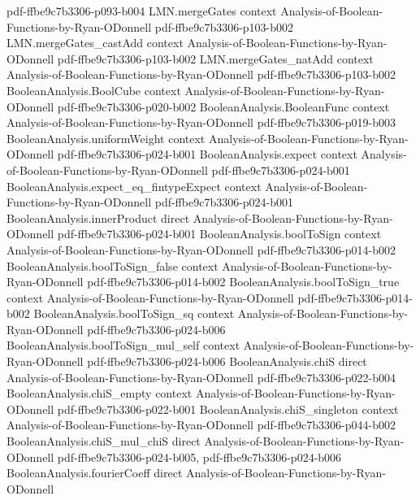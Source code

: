 \begin{lemma}
  {pdf-ffbe9c7b3306-p093-b004}
\proofstep
  {LMN.mergeGates}
  {context}
  {Analysis-of-Boolean-Functions-by-Ryan-ODonnell}
  {pdf-ffbe9c7b3306-p103-b002}
\proofstep
  {LMN.mergeGates_castAdd}
  {context}
  {Analysis-of-Boolean-Functions-by-Ryan-ODonnell}
  {pdf-ffbe9c7b3306-p103-b002}
\proofstep
  {LMN.mergeGates_natAdd}
  {context}
  {Analysis-of-Boolean-Functions-by-Ryan-ODonnell}
  {pdf-ffbe9c7b3306-p103-b002}
\proofstep
  {BooleanAnalysis.BoolCube}
  {context}
  {Analysis-of-Boolean-Functions-by-Ryan-ODonnell}
  {pdf-ffbe9c7b3306-p020-b002}
\proofstep
  {BooleanAnalysis.BooleanFunc}
  {context}
  {Analysis-of-Boolean-Functions-by-Ryan-ODonnell}
  {pdf-ffbe9c7b3306-p019-b003}
\proofstep
  {BooleanAnalysis.uniformWeight}
  {context}
  {Analysis-of-Boolean-Functions-by-Ryan-ODonnell}
  {pdf-ffbe9c7b3306-p024-b001}
\proofstep
  {BooleanAnalysis.expect}
  {context}
  {Analysis-of-Boolean-Functions-by-Ryan-ODonnell}
  {pdf-ffbe9c7b3306-p024-b001}
\proofstep
  {BooleanAnalysis.expect_eq_fintypeExpect}
  {context}
  {Analysis-of-Boolean-Functions-by-Ryan-ODonnell}
  {pdf-ffbe9c7b3306-p024-b001}
\proofstep
  {BooleanAnalysis.innerProduct}
  {direct}
  {Analysis-of-Boolean-Functions-by-Ryan-ODonnell}
  {pdf-ffbe9c7b3306-p024-b001}
\proofstep
  {BooleanAnalysis.boolToSign}
  {context}
  {Analysis-of-Boolean-Functions-by-Ryan-ODonnell}
  {pdf-ffbe9c7b3306-p014-b002}
\proofstep
  {BooleanAnalysis.boolToSign_false}
  {context}
  {Analysis-of-Boolean-Functions-by-Ryan-ODonnell}
  {pdf-ffbe9c7b3306-p014-b002}
\proofstep
  {BooleanAnalysis.boolToSign_true}
  {context}
  {Analysis-of-Boolean-Functions-by-Ryan-ODonnell}
  {pdf-ffbe9c7b3306-p014-b002}
\proofstep
  {BooleanAnalysis.boolToSign_sq}
  {context}
  {Analysis-of-Boolean-Functions-by-Ryan-ODonnell}
  {pdf-ffbe9c7b3306-p024-b006}
\proofstep
  {BooleanAnalysis.boolToSign_mul_self}
  {context}
  {Analysis-of-Boolean-Functions-by-Ryan-ODonnell}
  {pdf-ffbe9c7b3306-p024-b006}
\proofstep
  {BooleanAnalysis.chiS}
  {direct}
  {Analysis-of-Boolean-Functions-by-Ryan-ODonnell}
  {pdf-ffbe9c7b3306-p022-b004}
\proofstep
  {BooleanAnalysis.chiS_empty}
  {context}
  {Analysis-of-Boolean-Functions-by-Ryan-ODonnell}
  {pdf-ffbe9c7b3306-p022-b001}
\proofstep
  {BooleanAnalysis.chiS_singleton}
  {context}
  {Analysis-of-Boolean-Functions-by-Ryan-ODonnell}
  {pdf-ffbe9c7b3306-p044-b002}
\proofstep
  {BooleanAnalysis.chiS_mul_chiS}
  {direct}
  {Analysis-of-Boolean-Functions-by-Ryan-ODonnell}
  {pdf-ffbe9c7b3306-p024-b005,
    pdf-ffbe9c7b3306-p024-b006}
\proofstep
  {BooleanAnalysis.fourierCoeff}
  {direct}
  {Analysis-of-Boolean-Functions-by-Ryan-ODonnell}

\end{lemma}

